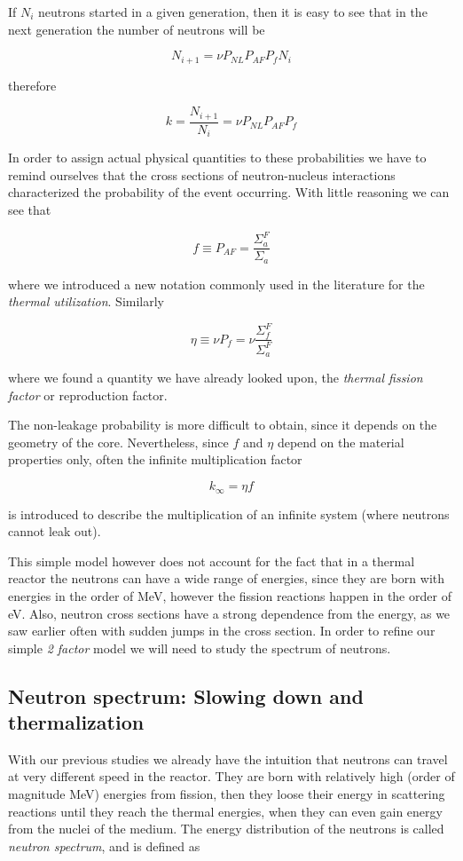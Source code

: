 If $N_i$ neutrons started in a given generation, then it is easy to see that in the next generation the number of neutrons will be

$$N_{i+1}=\nu P_{NL}P_{AF}P_{f}N_i$$

therefore

$$k=\frac{N_{i+1}}{N_i}=\nu P_{NL}P_{AF}P_{f}$$

In order to assign actual physical quantities to these probabilities we have to remind ourselves that the cross sections of neutron-nucleus interactions characterized the probability of the event occurring. With little reasoning we can see that

$$f\equiv P_{AF} = \frac{\Sigma_a^F}{\Sigma_a}$$

\noindent where we introduced a new notation commonly used in the literature for the \textit{thermal utilization}. Similarly 

$$\eta \equiv \nu P_f= \nu\frac{\Sigma_f^F}{\Sigma_a^F}$$

\noindent where we found a quantity we have already looked upon, the \textit{thermal fission factor} or reproduction factor.

The non-leakage probability is more difficult to obtain, since it depends on the geometry of the core. Nevertheless, since $f$ and $\eta$ depend on the material properties only, often the infinite multiplication factor 

$$k_\infty=\eta f$$

is introduced to describe the multiplication of an infinite system (where neutrons cannot leak out). 

This simple model however does not account for the fact that in a thermal reactor the neutrons can have a wide range of energies, since they are born with energies in the order of MeV, however the fission reactions happen in the order of eV. Also, neutron cross sections have a strong dependence from the energy, as we saw earlier often with sudden jumps in the cross section. In order to refine our simple \textit{2 factor} model we will need to study the spectrum of neutrons.

\subsection{Neutron spectrum: Slowing down and thermalization}

With our previous studies we already have the intuition that neutrons can travel at very different speed in the reactor. They are born with relatively high (order of magnitude MeV) energies from fission, then they loose their energy in scattering reactions until they reach the thermal energies, when they can even gain energy from the nuclei of the medium. The energy distribution of the neutrons is called \textit{neutron spectrum}, and is defined as 

